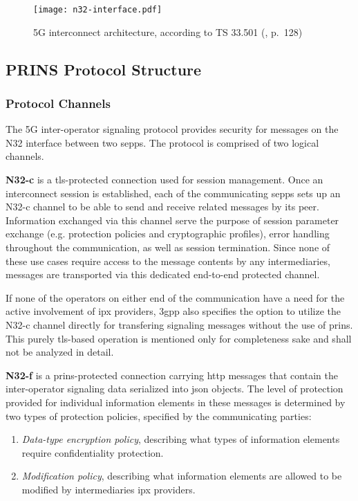 \begin{figure}[ht!]
    \texttt{[image: n32-interface.pdf]}
    \centering
    \caption{5G interconnect architecture, according to TS 33.501 (\cite{3gpp.33.501}, p.~128)}
    \label{fig:n32}
\end{figure}

\subsection{PRINS Protocol Structure}
\label{ssec:prins-structure}
\subsubsection{Protocol Channels}

The 5G inter-operator signaling protocol provides security for messages on the N32 interface between two \glspl{sepp}.
The protocol is comprised of two logical channels.\medskip

\textbf{N32-c} is a \gls{tls}-protected connection used for session management.
Once an interconnect session is established, each of the communicating \glspl{sepp} sets up an N32-c channel to be able to send and receive related messages by its peer.
Information exchanged via this channel serve the purpose of session parameter exchange (e.g. protection policies and cryptographic profiles), error handling throughout the communication, as well as session termination.
Since none of these use cases require access to the message contents by any intermediaries, messages are transported via this dedicated end-to-end protected channel.

If none of the operators on either end of the communication have a need for the active involvement of \gls{ipx} providers, \gls{3gpp} also specifies the option to utilize the N32-c channel directly for transfering signaling messages without the use of \gls{prins}.
This purely \gls{tls}-based operation is mentioned only for completeness sake and shall not be analyzed in detail.\medskip

\textbf{N32-f} is a \gls{prins}-protected connection carrying \gls{http} messages that contain the inter-operator signaling data serialized into \gls{json} objects.
The level of protection provided for individual information elements in these messages is determined by two types of protection policies, specified by the communicating parties:

\begin{enumerate}[label=--]
    \item \textit{Data-type encryption policy}, describing what types of information elements require confidentiality protection.
    \item \textit{Modification policy}, describing what information elements are allowed to be modified by intermediaries \gls{ipx} providers.
\end{enumerate}

